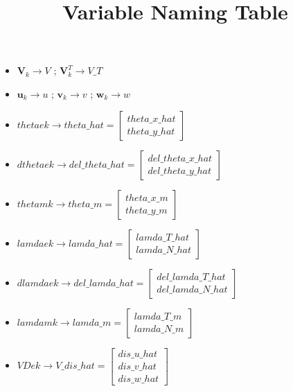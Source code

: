 \documentclass[UTF8,12pt,a4paper]{ctexart}
\title{\textbf{Variable Naming Table}}
\author{}
\date{}
\begin{document}
\maketitle

\begin{itemize}[itemsep=6pt]


\item $\mathbf{V}_k \to V$ \;;\; $\mathbf{V}_k^T \to V\_T$

\item $\mathbf{u}_k \to u$ \;;\; $\mathbf{v}_k \to v$ \;;\; $\mathbf{w}_k \to w$

\item $thetaek \to theta\_hat = \begin{bmatrix} theta\_x\_hat \\ theta\_y\_hat \end{bmatrix}$

\item $dthetaek \to del\_theta\_hat = \begin{bmatrix} del\_theta\_x\_hat \\ del\_theta\_y\_hat \end{bmatrix}$

\item $thetamk \to theta\_m = \begin{bmatrix} theta\_x\_m \\ theta\_y\_m \end{bmatrix}$

\item $lamdaek \to lamda\_hat = \begin{bmatrix} lamda\_T\_hat \\ lamda\_N\_hat \end{bmatrix}$

\item $dlamdaek \to del\_lamda\_hat = \begin{bmatrix} del\_lamda\_T\_hat \\ del\_lamda\_N\_hat \end{bmatrix}$

\item $lamdamk \to lamda\_m = \begin{bmatrix} lamda\_T\_m \\ lamda\_N\_m \end{bmatrix}$

\item $VDek \to V\_dis\_hat = \begin{bmatrix} dis\_u\_hat \\ dis\_v\_hat \\ dis\_w\_hat \end{bmatrix}$


\end{itemize}
\end{document}
